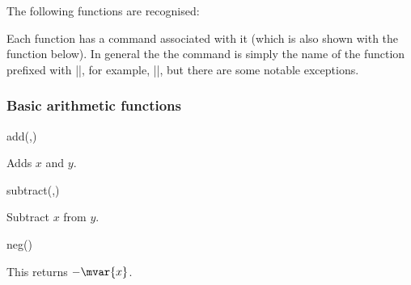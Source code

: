 \label{pgfmath-functions}

The following functions are recognised:

\medskip
\def\mathlink#1{\hyperlink{math:#1}{\tt#1}}
\bigskip


Each function has a \pgfname{} command associated with it (which is
also shown with the function below). In general the the command
is simply the name of the function prefixed with |\pgfmath|, for
example, |\pgfmathadd|, but there are some notable exceptions.

\subsubsection{Basic arithmetic functions}

\label{pgfmath-functions-basic}

\begin{math-function}{add(,)}
\mathcommand

  Adds $x$ and $y$.

\begin{codeexample}[]
 \pgfmathresult
\end{codeexample}
\end{math-function}

\begin{math-function}{subtract(,)}
\mathcommand

  Subtract $x$ from $y$.

\begin{codeexample}[]
 \pgfmathresult
\end{codeexample}
\end{math-function}

\begin{math-function}{neg()}
\mathcommand

	This returns $-\mvar{x}$.
	
\begin{codeexample}[]
 \pgfmathresult
\end{codeexample}

\end{math-function}


